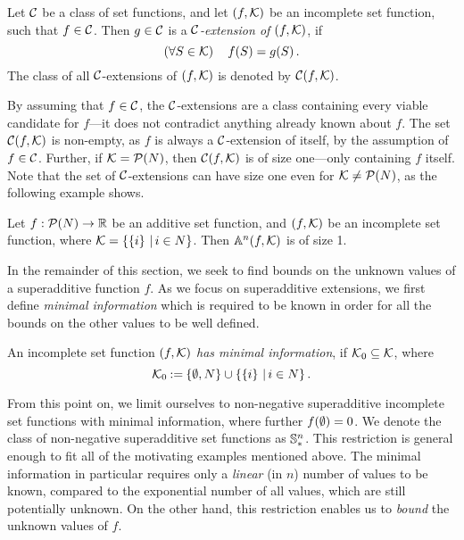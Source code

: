 \begin{defi}[$ \C $-extension]
  Let $ \C $ be a class of set functions, and let $ \left( f, \mathcal{K} \right) $ be an incomplete set function, such that $ f \in \mathcal{C} $.
  Then $ g \in \mathcal{C} $ is a \emph{$ \C $-extension of $ \left( f,\mathcal{K} \right) $}, if \[
    \left( \forall S \in \mathcal{K} \right)\quad f\!\left(S\right) = g\!\left(S\right).
  \]
  The class of all $ \C $-extensions of $ \left( f,\mathcal{K} \right) $ is denoted by $ \mathcal{C}\!\left(f, \mathcal{K}\right) $.
\end{defi}

By assuming that $ f \in \mathcal{C} $, the $ \C $-extensions are a class containing every viable candidate for $ f $---it does not contradict anything already known about $ f $.
The set $ \mathcal{C}\!\left(f, \mathcal{K}\right) $ is non-empty, as $ f $ is always a $ \C $-extension of itself, by the assumption of $ f \in \mathcal{C} $.
Further, if $ \mathcal{K} = \mathcal{P}\!\left(N\right) $, then $ \mathcal{C}\!\left(f, \mathcal{K}\right) $ is of size one---only containing $ f $ itself.
Note that the set of $ \C $-extensions can have size one even for $ \mathcal{K} \neq \mathcal{P}\!\left(N\right) $, as the following example shows.

\begin{example}[ ]
  Let $ f: \mathcal{P}\!\left(N\right) \to \mathbb{R} $ be an additive set function, and $ \left( f, \mathcal{K} \right) $ be an incomplete set function, where $ \mathcal{K} = \left\{ \left\{ i \right\} \,|\, i \in N \right\} $.
  Then $ \mathbb{A}^n\!\left(f, \mathcal{K}\right) $ is of size 1.
\end{example}

In the remainder of this section, we seek to find bounds on the unknown values of a superadditive function $ f $.
As we focus on superadditive extensions, we first define \emph{minimal information} which is required to be known in order for all the bounds on the other values to be well defined.

\begin{defi}
  An incomplete set function $ \left( f,\mathcal{K} \right) $ \emph{has minimal information}, if $ \mathcal{K}_0 \subseteq \mathcal{K} $, where \[
    \mathcal{K}_0 \mathbin{:=} \left\{ \emptyset, N \right\} \cup \left\{ \left\{ i \right\} \,|\, i \in N \right\}.
  \]
\end{defi}

From this point on, we limit ourselves to non-negative superadditive incomplete set functions with minimal information, where further $ f\!\left(\emptyset\right) = 0 $.
We denote the class of non-negative superadditive set functions as $ \mathbb{S}^n_* $.
This restriction is general enough to fit all of the motivating examples mentioned above.
The minimal information in particular requires only a \emph{linear} (in $n$) number of values to be known, compared to the exponential number of all values, which are still potentially unknown.
On the other hand, this restriction enables us to \emph{bound} the unknown values of $ f $.

